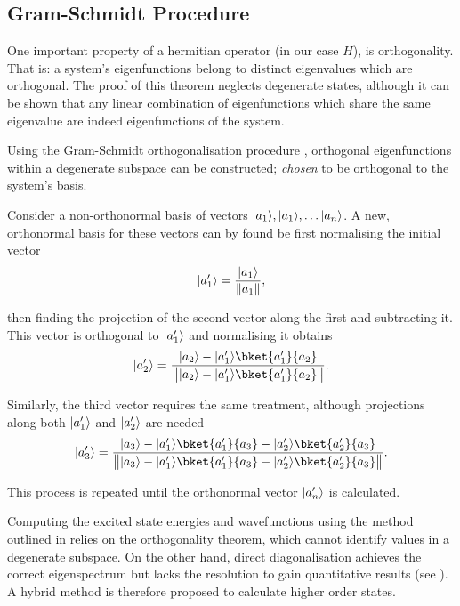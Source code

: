 \subsection{Gram-Schmidt Procedure}\label{subsec:gsp}

One important property of a hermitian operator (in our case $H$), is orthogonality. That is: a system's eigenfunctions belong to distinct eigenvalues which are orthogonal.
The proof of this theorem neglects degenerate states, although it can be shown that any linear combination of eigenfunctions which share the same eigenvalue are indeed eigenfunctions of the system.

Using the Gram-Schmidt orthogonalisation procedure \cite{Gram1883, Schmidt1907}, orthogonal eigenfunctions within a degenerate subspace can be constructed; \textit{chosen} to be orthogonal to the system's basis.

Consider a non-orthonormal basis of vectors $\lvert a_1\rangle, \lvert a_1\rangle, \ldots \lvert a_n\rangle$.
A new, orthonormal basis for these vectors can by found be first normalising the initial vector
\begin{equation}
\lvert a^\prime_1\rangle = \frac{\lvert a_1\rangle}{\lVert a_1\rVert},
\end{equation}

then finding the projection of the second vector along the first and subtracting it.
This vector is orthogonal to $\lvert a^\prime_1\rangle$ and normalising it obtains
\begin{equation}
\ket{a^\prime_2} = \frac{\ket{a_2}-\ket{a^\prime_1}\bket{a^\prime_1}{a_2}}{\norm[\big]{\ket{a_2}-\ket{a^\prime_1}\bket{a^\prime_1}{a_2}}}.
\end{equation}

Similarly, the third vector requires the same treatment, although projections along both $\lvert a^\prime_1\rangle$ and $\lvert a^\prime_2\rangle$ are needed
\begin{equation}
\ket{a^\prime_3} = \frac{\ket{a_3}-\ket{a^\prime_1}\bket{a^\prime_1}{a_3}-\ket{a^\prime_2}\bket{a^\prime_2}{a_3}}{\norm[\big]{\ket{a_3}-\ket{a^\prime_1}\bket{a^\prime_1}{a_3}-\ket{a^\prime_2}\bket{a^\prime_2}{a_3}}}.\label{eq:gs3ex}
\end{equation}

This process is repeated until the orthonormal vector $\lvert a^\prime_n\rangle$ is calculated.

Computing the excited state energies and wavefunctions using the method outlined in  relies on the orthogonality theorem, which cannot identify values in a degenerate subspace.
On the other hand, direct diagonalisation achieves the correct eigenspectrum but lacks the resolution to gain quantitative results (see ).
A hybrid method is therefore proposed to calculate higher order states.

